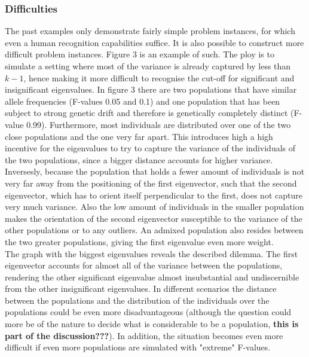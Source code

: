 \documentclass[a4paper, 11pt]{article}
\begin{document}
\subsubsection{Difficulties}
The past examples only demonstrate fairly simple problem instances, for which even a human recognition capabilities suffice. It is also possible to construct more difficult problem instances. Figure 3 is an example of such. The ploy is to simulate a setting where most of the variance is already captured by less than $k-1$, hence making it  more difficult to recognise the cut-off for significant and insignificant eigenvalues. In figure 3 there are two populations that have similar allele frequencies (F-values 0.05 and 0.1) and one population that has been subject to strong genetic drift and therefore is genetically completely distinct (F-value 0.99). Furthermore, most individuals are distributed over one of the two close populations and the one very far apart. This introduces high a high incentive for the eigenvalues to try to capture the variance of the individuals of the two populations, since a bigger distance accounts for higher variance. Inversesly, because the population that holds a fewer amount of individuals is not very far away from the positioning of the first eigenvector, such that the second eigenvector, which has to orient itself perpendicular to the first, does not capture very much variance. Also the low amount of individuals in the smaller population makes the orientation of the second eigenvector susceptible to the variance of the other populations or to any outliers. An admixed population also resides between the two greater populations, giving the first eigenvalue even more weight. \\

The graph with the biggest eigenvalues reveals the described dilemma. The first eigenvector accounts for almost all of the variance between the populations, rendering the other significant eigenvalue almost insubstantial and undiscernible from the other insignificant eigenvalues. In different scenarios the distance between the populations and the distribution of the individuals over the populations could be even more disadvantageous (although the question could more be of the nature to decide what is considerable to be a population, \textbf{this is part of the discussion???}). In addition, the situation becomes even more difficult if even more populations are simulated with "extreme" F-values.
\end{document}
